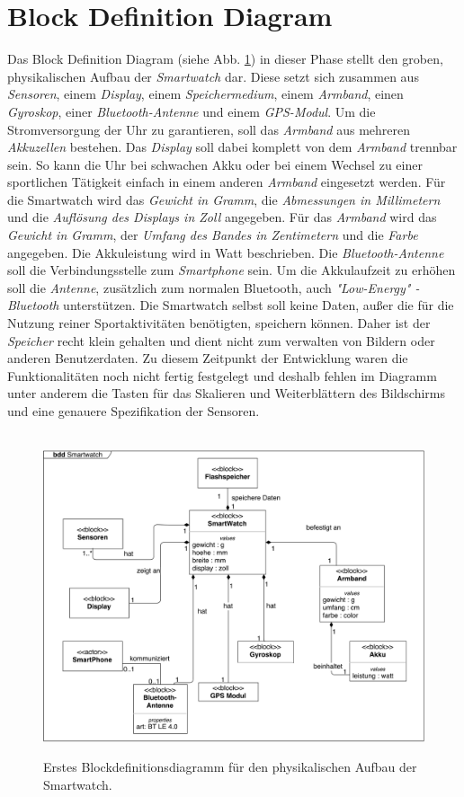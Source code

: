 \section{Block Definition Diagram}
\label{sec:blockdefinitiondiagram}

Das Block Definition Diagram (siehe Abb. \ref{fig:block1}) in dieser Phase stellt den groben, physikalischen Aufbau der \textit{Smartwatch} dar. Diese setzt sich zusammen aus \textit{Sensoren}, einem \textit{Display}, einem \textit{Speichermedium}, einem \textit{Armband}, einen \textit{Gyroskop}, einer \textit{Bluetooth-Antenne} und einem \textit{GPS-Modul}. Um die Stromversorgung der Uhr zu garantieren, soll das \textit{Armband} aus mehreren \textit{Akkuzellen} bestehen. Das \textit{Display} soll dabei komplett von dem \textit{Armband} trennbar sein. So kann die Uhr bei schwachen Akku oder bei einem Wechsel zu einer sportlichen Tätigkeit einfach in einem anderen \textit{Armband} eingesetzt werden. Für die Smartwatch wird das \textit{Gewicht in Gramm}, die \textit{Abmessungen in Millimetern} und die \textit{Auflösung des Displays in Zoll} angegeben. Für das \textit{Armband} wird das \textit{Gewicht in Gramm}, der \textit{Umfang des Bandes in Zentimetern} und die \textit{Farbe} angegeben. Die Akkuleistung wird in Watt beschrieben. Die \textit{Bluetooth-Antenne} soll die Verbindungsstelle zum \textit{Smartphone} sein. Um die Akkulaufzeit zu erhöhen soll die \textit{Antenne}, zusätzlich zum normalen Bluetooth, auch \textit{"Low-Energy" -Bluetooth} unterstützen. Die Smartwatch selbst soll keine Daten, außer die für die Nutzung reiner Sportaktivitäten benötigten, speichern können. Daher ist der \textit{Speicher} recht klein gehalten und dient nicht zum verwalten von Bildern oder anderen Benutzerdaten.
Zu diesem Zeitpunkt der Entwicklung waren die Funktionalitäten noch nicht fertig festgelegt und deshalb fehlen im Diagramm unter anderem die Tasten für das Skalieren und Weiterblättern des Bildschirms und eine genauere Spezifikation der Sensoren.

\begin{figure}[h]
\centering\
\includegraphics[width=\textwidth]{img/block1}
\caption{Erstes Blockdefinitionsdiagramm für den physikalischen Aufbau der Smartwatch.}\label{fig:block1}
\end{figure}